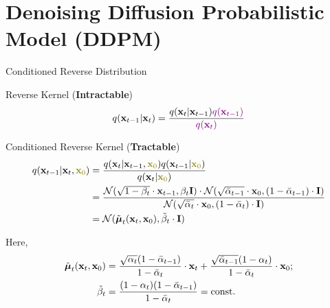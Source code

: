 \documentclass{beamer}
\begin{document}
\section{Denoising Diffusion Probabilistic Model (DDPM)}
\begin{frame}{Conditioned Reverse Distribution}
    \begin{block}{Reverse Kernel (\textbf{Intractable})}
        \vspace{-0.3cm}
        \[
            q(\mathbf{x}_{t-1}|\mathbf{x}_{t}) = \frac{q(\mathbf{x}_{t}|\mathbf{x}_{t-1}) {\color{violet}q(\mathbf{x}_{t-1})}}{{\color{violet}q(\mathbf{x}_{t})}} 
        \]
        \vspace{-0.5cm}
    \end{block}
    \begin{block}{Conditioned Reverse Kernel (\textbf{Tractable})}
        \vspace{-0.6cm}
        \begin{align*}
            q(\bx_{t-1}|\bx_{t}, {\color{olive}\bx_0}) & = \frac{q(\bx_{t}|\bx_{t-1}, {\color{olive}\bx_0}) q(\bx_{t-1} | {\color{olive}\bx_0}) }{q(\bx_{t}| {\color{olive}\bx_0})} \\
            & = \frac{\cN(\sqrt{1 - \beta_t} \cdot \bx_{t-1}, \beta_t \bI) \cdot \cN(\sqrt{\bar{\alpha}_{t-1}} \cdot \bx_0, (1 - \bar{\alpha}_{t-1}) \cdot \bI)}{ \cN(\sqrt{\bar{\alpha}_t} \cdot \bx_0, (1 - \bar{\alpha}_t) \cdot \bI)} \\
            &= \cN(\tilde{\bmu}_t(\bx_t, \bx_0), \tilde{\beta}_t \cdot \bI)
        \end{align*}
        \vspace{-0.7cm}
    \end{block}
    Here,
    \begin{align*}
        \tilde{\boldsymbol{\mu}}_t(\mathbf{x}_t, \mathbf{x}_0) &= \frac{\sqrt{\alpha_t}(1 - \bar{\alpha}_{t-1})}{1 - \bar{\alpha}_t} \cdot \mathbf{x}_t + \frac{\sqrt{\bar{\alpha}_{t-1}}(1 - \alpha_t)}{1 - \bar{\alpha}_t} \cdot \mathbf{x}_0; \\
        \tilde{\beta}_t &= \frac{(1 - \alpha_t)(1 - \bar{\alpha}_{t-1})}{1 - \bar{\alpha}_t} = \text{const}.
    \end{align*}
\end{frame}
\end{document}

